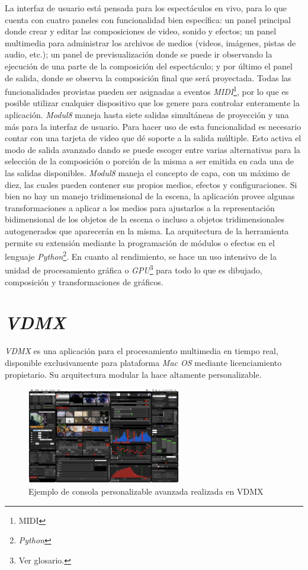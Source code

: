 La interfaz de usuario está pensada para los espectáculos en vivo, para lo que cuenta con cuatro paneles con funcionalidad bien específica: un panel principal donde crear y editar las composiciones de video, sonido y efectos; un panel multimedia para administrar los archivos de medios (videos, imágenes, pistas de audio, etc.); un panel de previsualización donde se puede ir observando la ejecución de una parte de la composición del espectáculo; y por último el panel de salida, donde se observa la composición final que será proyectada. Todas las funcionalidades provistas pueden ser asignadas a eventos \emph{MIDI}\footnote{MIDI}, por lo que es posible utilizar cualquier dispositivo que los genere para controlar enteramente la aplicación.
\emph{Modul8} maneja hasta siete salidas simultáneas de proyección y una más para la interfaz de usuario. Para hacer uso de esta funcionalidad es necesario contar con una tarjeta de video que dé soporte a la salida múltiple. Esto activa el modo de salida avanzado dando se puede escoger entre varias alternativas para la selección de la composición o porción de la misma a ser emitida en cada una de las salidas disponibles. \emph{Modul8} maneja el concepto de capa, con un máximo de diez, las cuales pueden contener sus propios medios, efectos y configuraciones.
Si bien no hay un manejo tridimensional de la escena, la aplicación provee algunas transformaciones a aplicar a los medios para ajustarlos a la representación bidimensional de los objetos de la escena o incluso a objetos tridimensionales autogenerados que aparecerán en la misma.
La arquitectura de la herramienta permite su extensión mediante la programación de módulos o efectos en el lenguaje \emph{Python}\footnote{\emph{Python}}.
En cuanto al rendimiento, se hace un uso intensivo de la unidad de procesamiento gráfica o \emph{GPU}\footnote{Ver glosario.} para todo lo que es dibujado, composición y transformaciones de gráficos.

\section{\emph{VDMX}}
\emph{VDMX}\cite{VDMX} es una aplicación para el procesamiento multimedia en tiempo real, disponible exclusivamente para plataforma \emph{Mac OS} mediante licenciamiento propietario. Su arquitectura modular la hace altamente personalizable.

\begin{figure}[H]
  \centering
    \includegraphics[width=0.6\textwidth]{./Cap3_aplicaciones/apps-vdmx.png}
  \caption{Ejemplo de consola personalizable avanzada realizada en VDMX}
  \label{fig:Apps-VDMX}
\end{figure}

